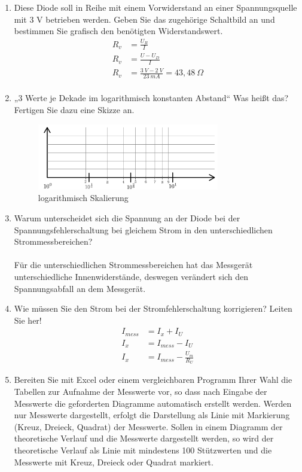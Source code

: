 \begin{enumerate}[label=\alph*)]
	\item Diese Diode soll in Reihe mit einem Vorwiderstand an einer Spannungsquelle mit 3 V betrieben werden. Geben Sie das zugehörige Schaltbild an und bestimmen Sie grafisch den benötigten Widerstandswert.
    \begin{align*}
      R_v &= \frac{U_R}{I}\\
      R_v &= \frac{U - U_D}{I}\\
      R_v &= \frac{3\ V - 2\ V}{23\ mA} = 43,48\ \Omega\\
    \end{align*}
	\item „3 Werte je Dekade im logarithmisch konstanten Abstand“ Was heißt das? Fertigen Sie dazu eine Skizze an.
    \begin{figure}[h!]
      \begin{center}
        \includegraphics[width=0.75\textwidth]{img/2.1.4.1}
      \end{center}
      \caption{logarithmisch Skalierung}\label{img:2.1.4.1}
    \end{figure}
    
	\item Warum unterscheidet sich die Spannung an der Diode bei der Spannungsfehlerschaltung bei gleichem Strom in den unterschiedlichen Strommessbereichen?\\\ \\
    Für die unterschiedlichen Strommessbereichen hat das Messgerät unterschiedliche Innenwiderstände, deswegen verändert sich den Spannungsabfall an dem Messgerät.
	\item Wie müssen Sie den Strom bei der Stromfehlerschaltung korrigieren? Leiten Sie her!
    \begin{align*}
      I_{mess} &= I_x + I_U\\ 
      I_x &= I_{mess} - I_U\\ 
      I_x &= I_{mess} - \frac{U_m}{R_U}
    \end{align*}
	\item Bereiten Sie mit Excel oder einem vergleichbaren Programm Ihrer Wahl die Tabellen zur Aufnahme der Messwerte vor, so dass nach Eingabe der Messwerte die geforderten Diagramme automatisch erstellt werden. Werden nur Messwerte dargestellt, erfolgt die Darstellung als Linie mit Markierung (Kreuz, Dreieck, Quadrat) der Messwerte. Sollen in einem Diagramm der theoretische Verlauf und die Messwerte dargestellt werden, so wird der theoretische Verlauf als Linie mit mindestens 100 Stützwerten und die Messwerte mit Kreuz, Dreieck oder Quadrat markiert.
\end{enumerate}

